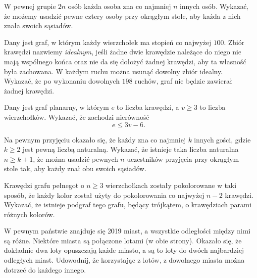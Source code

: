 \begin{problem}{1}
	W pewnej grupie $2n$ osób każda osoba zna co najmniej $n$ innych osób. Wykazać, że możemy usadzić pewne cztery osoby przy okrągłym stole, aby każda z nich znała swoich sąsiadów.
\end{problem}

\begin{problem}{2}
	Dany jest graf, w którym każdy wierzchołek ma stopień co najwyżej $100$. Zbiór krawędzi nazwiemy \textit{idealnym}, jeśli żadne dwie krawędzie należące do niego nie mają wspólnego końca oraz nie da się dołożyć żadnej krawędzi, aby ta własność była zachowana. W każdym ruchu można usunąć dowolny zbiór idealny. Wykazać, że po wykonaniu dowolnych $198$ ruchów, graf nie będzie zawierał żadnej krawędzi.
\end{problem}

\begin{problem}{3}
	Dany jest graf planarny, w którym $e$ to liczba krawędzi, a $v \geqslant 3$ to liczba wierzchołków. Wykazać, że zachodzi nierówność
	\[
		e \leqslant 3v - 6.
	\]
\end{problem}

\begin{problem}{4}
	Na pewnym przyjęciu okazało się, że każdy zna co najmniej $k$ innych gości, gdzie $k \geqslant 2$ jest pewną liczbą naturalną. Wykazać, że istnieje taka liczba naturalna $n\geqslant k + 1$, że można usadzić pewnych $n$ uczestników przyjęcia przy okrągłym stole tak, aby każdy znał obu swoich sąsiadów.
\end{problem}


\begin{problem}{5}
	Krawędzi grafu pełnegot o $n \geqslant 3$ wierzchołkach zostały pokolorowane w taki sposób, że każdy kolor został użyty do pokolorowania co najwyżej $n - 2$ krawędzi. Wykazać, że istnieje podgraf tego grafu, będący trójkątem, o krawędziach parami różnych kolorów.
\end{problem}

\begin{problem}{6}
	W pewnym państwie znajduje się 2019 miast, a wszystkie odległości między nimi są różne. Niektóre miasta są połączone lotami (w obie strony). Okazało się, że dokładnie dwa loty opuszczają każde miasto, a są to loty do dwóch najbardziej odległych miast. Udowodnij, że korzystając z lotów, z dowolnego miasta można dotrzeć do każdego innego.
\end{problem}